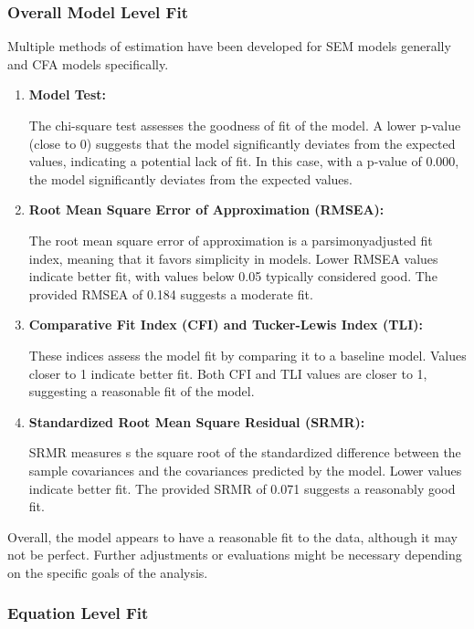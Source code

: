 \documentclass[11pt]{article}
\begin{document}
			\subsubsection{Overall Model Level Fit}
		
			Multiple methods of estimation have been developed for SEM models generally
			and CFA models specifically.
		
			\begin{enumerate}
				\item \textbf{Model Test:} 
				
				The chi-square test assesses the goodness of fit of the model. A lower p-value (close to 0) suggests that the model significantly deviates from the expected values, indicating a potential lack of fit. In this case, with a p-value of 0.000, the model significantly deviates from the expected values.
				
				\item \textbf{Root Mean Square Error of Approximation (RMSEA):}
				
				The root mean square error of approximation is a parsimonyadjusted fit index, meaning that it favors simplicity in models. Lower RMSEA values indicate better fit, with values below 0.05 typically considered good. The provided RMSEA of 0.184 suggests a moderate fit. 
				\newpage
				\item \textbf{Comparative Fit Index (CFI) and Tucker-Lewis Index (TLI):}
				
				These indices assess the model fit by comparing it to a baseline model. Values closer to 1 indicate better fit. Both CFI and TLI values are closer to 1, suggesting a reasonable fit of the model.
				
				\item \textbf{Standardized Root Mean Square Residual (SRMR):}
				
				SRMR measures s the square root
				of the standardized difference between the sample covariances and the covariances predicted by the model. Lower values indicate better fit. The provided SRMR of 0.071 suggests a reasonably good fit.
			\end{enumerate}
		
		Overall, the model appears to have a reasonable fit to the data, although it may not be perfect. Further adjustments or evaluations might be necessary depending on the specific goals of the analysis.
		
		\subsubsection{Equation Level Fit}
			
\end{document}
